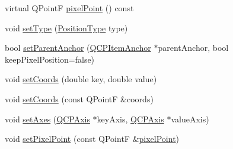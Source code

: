 \begin{DoxyCompactItemize}
\item 
virtual Q\-Point\-F \hyperlink{classQCPItemPosition_ae490f9c76ee2ba33752c495d3b6e8fb5}{pixel\-Point} () const 
\item 
void \hyperlink{classQCPItemPosition_aa476abf71ed8fa4c537457ebb1a754ad}{set\-Type} (\hyperlink{classQCPItemPosition_aad9936c22bf43e3d358552f6e86dbdc8}{Position\-Type} type)
\item 
bool \hyperlink{classQCPItemPosition_ac094d67a95d2dceafa0d50b9db3a7e51}{set\-Parent\-Anchor} (\hyperlink{classQCPItemAnchor}{Q\-C\-P\-Item\-Anchor} $\ast$parent\-Anchor, bool keep\-Pixel\-Position=false)
\item 
void \hyperlink{classQCPItemPosition_aa988ba4e87ab684c9021017dcaba945f}{set\-Coords} (double key, double value)
\item 
void \hyperlink{classQCPItemPosition_acc70b3abc143287f806e5f154e5e07b0}{set\-Coords} (const Q\-Point\-F \&coords)
\item 
void \hyperlink{classQCPItemPosition_a2185f45c75ac8cb9be89daeaaad50e37}{set\-Axes} (\hyperlink{classQCPAxis}{Q\-C\-P\-Axis} $\ast$key\-Axis, \hyperlink{classQCPAxis}{Q\-C\-P\-Axis} $\ast$value\-Axis)
\item 
void \hyperlink{classQCPItemPosition_ab404e56d9ac2ac2df0382c57933a71ef}{set\-Pixel\-Point} (const Q\-Point\-F \&\hyperlink{classQCPItemPosition_ae490f9c76ee2ba33752c495d3b6e8fb5}{pixel\-Point})
\end{DoxyCompactItemize}
